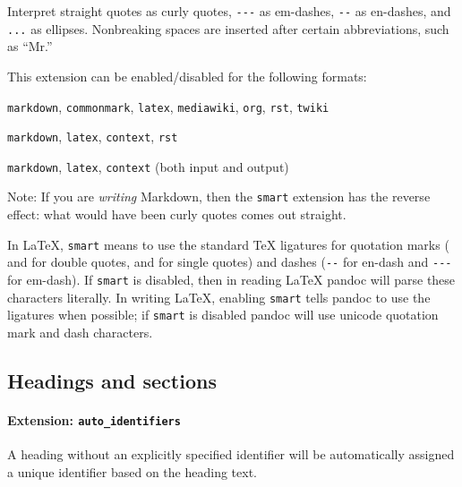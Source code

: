 \documentclass[]{article}
\providecommand{\tightlist}{%
  \setlength{\itemsep}{0pt}\setlength{\parskip}{0pt}}
\begin{document}
Interpret straight quotes as curly quotes, \texttt{-\/-\/-} as
em-dashes, \texttt{-\/-} as en-dashes, and \texttt{...} as ellipses.
Nonbreaking spaces are inserted after certain abbreviations, such as
``Mr.''

This extension can be enabled/disabled for the following formats:

\begin{description}
\tightlist
\item[input formats]
\texttt{markdown}, \texttt{commonmark}, \texttt{latex},
\texttt{mediawiki}, \texttt{org}, \texttt{rst}, \texttt{twiki}
\item[output formats]
\texttt{markdown}, \texttt{latex}, \texttt{context}, \texttt{rst}
\item[enabled by default in]
\texttt{markdown}, \texttt{latex}, \texttt{context} (both input and
output)
\end{description}

Note: If you are \emph{writing} Markdown, then the \texttt{smart}
extension has the reverse effect: what would have been curly quotes
comes out straight.

In LaTeX, \texttt{smart} means to use the standard TeX ligatures for
quotation marks (\texttt{\textasciigrave{}\textasciigrave{}} and
\texttt{\textquotesingle{}\textquotesingle{}} for double quotes,
\texttt{\textasciigrave{}} and \texttt{\textquotesingle{}} for single
quotes) and dashes (\texttt{-\/-} for en-dash and \texttt{-\/-\/-} for
em-dash). If \texttt{smart} is disabled, then in reading LaTeX pandoc
will parse these characters literally. In writing LaTeX, enabling
\texttt{smart} tells pandoc to use the ligatures when possible; if
\texttt{smart} is disabled pandoc will use unicode quotation mark and
dash characters.

\hypertarget{headings-and-sections}{%
\subsection{Headings and sections}\label{headings-and-sections}}

\hypertarget{extension-auto_identifiers}{%
\paragraph{\texorpdfstring{Extension:
\texttt{auto\_identifiers}}{Extension: auto\_identifiers}}\label{extension-auto_identifiers}}

A heading without an explicitly specified identifier will be
automatically assigned a unique identifier based on the heading text.
\end{document}
